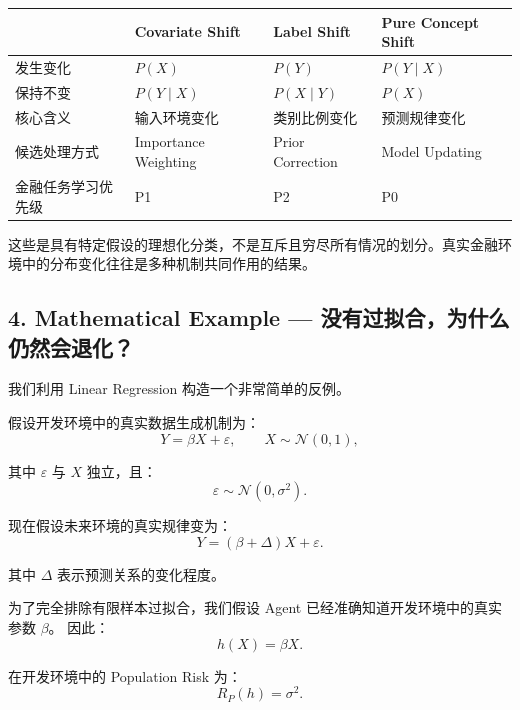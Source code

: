\begin{readertable}
\begin{longtable}[]{@{}
  >{\raggedright\arraybackslash}p{}
  >{\raggedright\arraybackslash}p{}
  >{\raggedright\arraybackslash}p{}
  >{\raggedright\arraybackslash}p{}@{}}
\toprule
& Covariate Shift & Label Shift & Pure Concept Shift \\
\midrule
\endhead
发生变化 & \(P(X)\) & \(P(Y)\) & \(P(Y\mid X)\) \\
保持不变 & \(P(Y\mid X)\) & \(P(X\mid Y)\) & \(P(X)\) \\
核心含义 & 输入环境变化 & 类别比例变化 & 预测规律变化 \\
候选处理方式 & Importance Weighting & Prior Correction & Model Updating \\
金融任务学习优先级 & P1 & P2 & P0 \\
\bottomrule
\end{longtable}
\end{readertable}

这些是具有特定假设的理想化分类，不是互斥且穷尽所有情况的划分。真实金融环境中的分布变化往往是多种机制共同作用的结果。

\hypertarget{part-2-23-0001-mathematical-example-ux6ca1ux6709ux8fc7ux62dfux5408ux4e3aux4ec0ux4e48ux4ecdux7136ux4f1aux9000ux5316}{%
\subsection{4. Mathematical Example --- 没有过拟合，为什么仍然会退化？}\label{part-2-23-0001-mathematical-example-ux6ca1ux6709ux8fc7ux62dfux5408ux4e3aux4ec0ux4e48ux4ecdux7136ux4f1aux9000ux5316}}

我们利用 Linear Regression 构造一个非常简单的反例。

假设开发环境中的真实数据生成机制为：
\[Y=\beta X+\varepsilon,
\qquad
X\sim\mathcal N(0,1),\]

其中 \(\varepsilon\) 与 \(X\) 独立，且：
\[\varepsilon\sim\mathcal N(0,\sigma^2).\]

现在假设未来环境的真实规律变为：
\[Y=(\beta+\Delta)X+\varepsilon.\]

其中 \(\Delta\) 表示预测关系的变化程度。

为了完全排除有限样本过拟合，我们假设 Agent 已经准确知道开发环境中的真实参数 \(\beta\)。 因此：
\[h(X)=\beta X.\]

在开发环境中的 Population Risk 为：
\[R_P(h)=\sigma^2.\]

